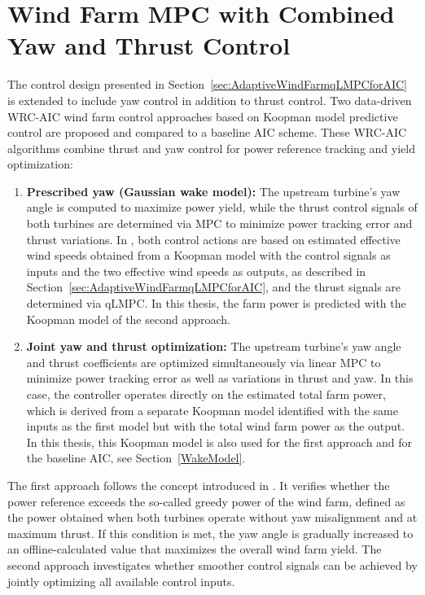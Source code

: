 \section{Wind Farm MPC with Combined Yaw and Thrust Control} 
\label{sec:WindFarmLinearMPCforWRC-AIC}

The control design presented in Section~\ref{sec:AdaptiveWindFarmqLMPCforAIC} is extended to include yaw control in addition to thrust control. Two data-driven WRC-AIC wind farm control approaches based on Koopman model predictive control are proposed and compared to a baseline AIC scheme. These WRC-AIC algorithms combine thrust and yaw control for power reference tracking and yield optimization:
\begin{enumerate}
    \item \textbf{Prescribed yaw (Gaussian wake model):}  
    The upstream turbine's yaw angle is computed to maximize power yield, while the thrust control signals of both turbines are determined via MPC to minimize power tracking error and thrust variations. In \cite{dittmer2023koopman}, both control actions are based on estimated effective wind speeds obtained from a Koopman model with the control signals as inputs and the two effective wind speeds as outputs, as described in Section~\ref{sec:AdaptiveWindFarmqLMPCforAIC}, and the thrust signals are determined via qLMPC. In this thesis, the farm power is predicted with the Koopman model of the second approach.
    
    \item \textbf{Joint yaw and thrust optimization:}  
    The upstream turbine's yaw angle and thrust coefficients are optimized simultaneously via linear MPC to minimize power tracking error as well as variations in thrust and yaw. In this case, the controller operates directly on the estimated total farm power, which is derived from a separate Koopman model identified with the same inputs as the first model but with the total wind farm power as the output. In this thesis, this Koopman model is also used for the first approach and for the baseline AIC, see Section~\ref{WakeModel}.
\end{enumerate}
The first approach follows the concept introduced in \cite{boersma2017tutorial}. It verifies whether the power reference exceeds the so-called greedy power of the wind farm, defined as the power obtained when both turbines operate without yaw misalignment and at maximum thrust. If this condition is met, the yaw angle is gradually increased to an offline-calculated value that maximizes the overall wind farm yield. The second approach investigates whether smoother control signals can be achieved by jointly optimizing all available control inputs.

